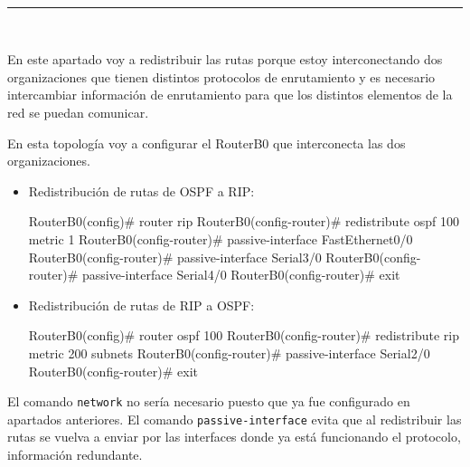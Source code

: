 
\begin{center}
	{\fboxrule=4pt } \\
	\setcounter{chapter}{3}
	\setcounter{section}{0}
	\rule{15cm}{0pt} \\
\end{center}
\par En este apartado voy a redistribuir las rutas porque estoy interconectando dos organizaciones que tienen distintos protocolos de enrutamiento y es necesario intercambiar información de enrutamiento para que los distintos elementos de la red se puedan comunicar.
\par En esta topología voy a configurar el RouterB0 que interconecta las dos organizaciones.
\begin{itemize}
	\item Redistribución de rutas de OSPF a RIP:
\begin{listing}[style=consola]
RouterB0(config)# router rip
RouterB0(config-router)# redistribute ospf 100 metric 1
RouterB0(config-router)# passive-interface FastEthernet0/0
RouterB0(config-router)# passive-interface Serial3/0
RouterB0(config-router)# passive-interface Serial4/0
RouterB0(config-router)# exit
\end{listing}
	\item Redistribución de rutas de RIP a OSPF:
\begin{listing}[style=consola]
RouterB0(config)# router ospf 100
RouterB0(config-router)# redistribute rip metric 200 subnets 
RouterB0(config-router)# passive-interface Serial2/0
RouterB0(config-router)# exit
\end{listing}
\end{itemize}
\par El comando \texttt{network} no sería necesario puesto que ya fue configurado en apartados anteriores. El comando \texttt{passive-interface} evita que al redistribuir las rutas se vuelva a enviar por las interfaces donde ya está funcionando el protocolo, información redundante.





\newpage